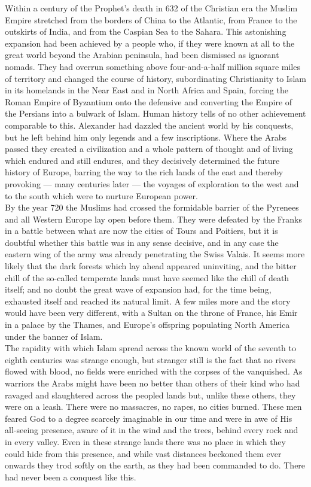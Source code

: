 \documentclass[10pt, twoside,openright]{book}
\begin{document}
Within a century of the Prophet's death in 632 of the Christian era the Muslim Empire stretched from the borders of China to the Atlantic, from France to the outskirts of India, and from the Caspian Sea to the Sahara. This astonishing expansion had been achieved by a people who, if they were known at all to the great world beyond the Arabian peninsula, had been dismissed as ignorant nomads. They had overrun something above four\hyp{}and\hyp{}a\hyp{}half million square miles of territory and changed the course of history, subordinating Christianity to Islam in its homelands in the Near East and in North Africa and Spain, forcing the Roman Empire of Byzantium onto the defensive and converting the Empire of the Persians into a bulwark of Islam. Human history tells of no other achievement comparable to this. Alexander had dazzled the ancient world by his conquests, but he left behind him only legends and a few inscriptions. Where the Arabs passed they created a civilization and a whole pattern of thought and of living which endured and still endures, and they decisively determined the future history of Europe, barring the way to the rich lands of the east and thereby provoking --- many centuries later --- the voyages of exploration to the west and to the south which were to nurture European power. \\

By the year 720 the Muslims had crossed the formidable barrier of the Pyrenees and all Western Europe lay open before them. They were defeated by the Franks in a battle between what are now the cities of Tours and Poitiers, but it is doubtful whether this battle was in any sense decisive, and in any case the eastern wing of the army was already penetrating the Swiss Valais. It seems more likely that the dark forests which lay ahead appeared uninviting, and the bitter chill of the so\hyp{}called temperate lands must have seemed like the chill of death itself; and no doubt the great wave of expansion had, for the time being, exhausted itself and reached its natural limit. A few miles more and the story would have been very different, with a Sultan on the throne of France, his Emir in a palace by the Thames, and Europe's offspring populating North America under the banner of Islam. \\

The rapidity with which Islam spread across the known world of the seventh to eighth centuries was strange enough, but stranger still is the fact that no rivers flowed with blood, no fields were enriched with the corpses of the vanquished. As warriors the Arabs might have been no better than others of their kind who had ravaged and slaughtered across the peopled lands but, unlike these others, they were on a leash. There were no massacres, no rapes, no cities burned. These men feared God to a degree scarcely imaginable in our time and were in awe of His all\hyp{}seeing presence, aware of it in the wind and the trees, behind every rock and in every valley. Even in these strange lands there was no place in which they could hide from this presence, and while vast distances beckoned them ever onwards they trod softly on the earth, as they had been commanded to do. There had never been a conquest like this. \\
\end{document}
